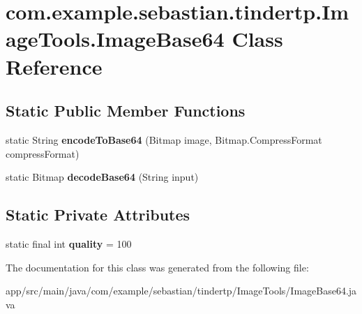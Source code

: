 \hypertarget{classcom_1_1example_1_1sebastian_1_1tindertp_1_1ImageTools_1_1ImageBase64}{}\section{com.\+example.\+sebastian.\+tindertp.\+Image\+Tools.\+Image\+Base64 Class Reference}
\label{classcom_1_1example_1_1sebastian_1_1tindertp_1_1ImageTools_1_1ImageBase64}
\subsection*{Static Public Member Functions}
\begin{DoxyCompactItemize}
\item 
static String {\bfseries encode\+To\+Base64} (Bitmap image, Bitmap.\+Compress\+Format compress\+Format)\hypertarget{classcom_1_1example_1_1sebastian_1_1tindertp_1_1ImageTools_1_1ImageBase64_a23bf5724833607045829525fb82a1c85}{}\label{classcom_1_1example_1_1sebastian_1_1tindertp_1_1ImageTools_1_1ImageBase64_a23bf5724833607045829525fb82a1c85}

\item 
static Bitmap {\bfseries decode\+Base64} (String input)\hypertarget{classcom_1_1example_1_1sebastian_1_1tindertp_1_1ImageTools_1_1ImageBase64_a1c57a6e5a8ba9401e5d4782f27e155d8}{}\label{classcom_1_1example_1_1sebastian_1_1tindertp_1_1ImageTools_1_1ImageBase64_a1c57a6e5a8ba9401e5d4782f27e155d8}

\end{DoxyCompactItemize}
\subsection*{Static Private Attributes}
\begin{DoxyCompactItemize}
\item 
static final int {\bfseries quality} = 100\hypertarget{classcom_1_1example_1_1sebastian_1_1tindertp_1_1ImageTools_1_1ImageBase64_af6a32385230c213f40649e5bb220c95c}{}\label{classcom_1_1example_1_1sebastian_1_1tindertp_1_1ImageTools_1_1ImageBase64_af6a32385230c213f40649e5bb220c95c}

\end{DoxyCompactItemize}


The documentation for this class was generated from the following file\+:\begin{DoxyCompactItemize}
\item 
app/src/main/java/com/example/sebastian/tindertp/\+Image\+Tools/Image\+Base64.\+java\end{DoxyCompactItemize}
